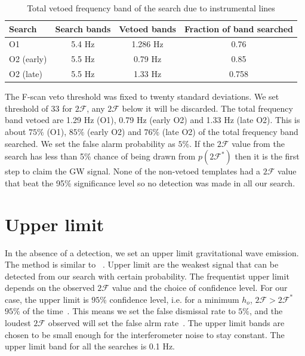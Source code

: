 \documentclass{ttuthes2007}
\begin{document}
\begin{table} 
\centering
\begin{tabular}{lccc} 
\hline
\hline
\textrm{Search} & \textrm{Search bands} & \textrm{Vetoed bands} &
\textrm{Fraction of band searched}\\[5pt]   
\hline
\ac{O1} & 5.4 Hz & 1.286 Hz & 0.76\\[5pt] 
\ac{O2} (early)& 5.5 Hz  & 0.79 Hz & 0.85\\[5pt] 
\ac{O2} (late) & 5.5 Hz & 1.33 Hz & 0.758\\  
\hline
\hline
\end{tabular} 
\caption{Total vetoed frequency band of the search due to instrumental
lines}\label{table:veto} 
\end{table} 
 
The F-scan veto threshold was fixed to twenty standard
deviations.  We set threshold of 33 for $2\mathcal{F}$, any $2\mathcal{F}$ below
it will be discarded.  The total frequency band vetoed are 1.29 Hz (O1), 0.79 Hz
(early O2) and 1.33 Hz (late O2). This is about $75\%$ (O1), $85\%$ (early O2)
and $76\%$ (late O2) of the total frequency band searched. We set the false
alarm probability as $5\%$. If the $2\mathcal{F}$
value from the search has less than 5\% chance of being drawn from
$p(2\mathcal{F}^*)$ then it is the first step to claim the \ac{GW} signal. None
of the non-vetoed templates had a $2\mathcal{F}$ value that beat the 95\%
significance level so no detection was made in all our search.

\section{Upper limit}
In the absence of a detection, we set an upper limit gravitational wave
emission. The method is similar to ~\citet{Lindblom_2020}. Upper limit are the
weakest signal that can be detected from our search with certain probability.
The frequentist upper limit depends on the observed $2\mathcal{F}$ value and the
choice of confidence level. For our case, the upper limit is $95\%$ confidence
level, i.e. for a minimum $h_o$, $2\mathcal{F} > 2\mathcal{F}^*$ $95\%$ of the
time~\cite{Romano_2017}. This means we set the false dismissal rate to $5\%$,
and the loudest $2\mathcal{F}$ observed will set the false alrm
rate~\cite{Aasi_2015}. The upper limit bands are chosen to be small enough for
the interferometer noise to stay constant. The upper limit band for all the
searches is 0.1 Hz. 
\end{document}
